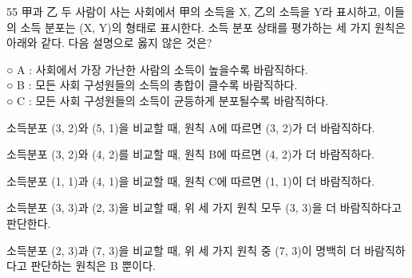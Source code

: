 \begin{question}{55}
甲과 乙 두 사람이 사는 사회에서 甲의 소득을 X, 乙의 소득을 Y라 표시하고, 이들의 소득 분포는 (X, Y)의 형태로 표시한다. 소득 분포 상태를 평가하는 세 가지 원칙은 아래와 같다. 다음 설명으로 옳지 않은 것은?
\begin{framedtext}
○ A : 사회에서 가장 가난한 사람의 소득이 높을수록 바람직하다.\\
○ B : 모든 사회 구성원들의 소득의 총합이 클수록 바람직하다.\\
○ C : 모든 사회 구성원들의 소득이 균등하게 분포될수록 바람직하다.
\end{framedtext}
\begin{choices}
  \item 소득분포 (3, 2)와 (5, 1)을 비교할 때, 원칙 A에 따르면 (3, 2)가 더 바람직하다.
  \item 소득분포 (3, 2)와 (4, 2)를 비교할 때, 원칙 B에 따르면 (4, 2)가 더 바람직하다.
  \item 소득분포 (1, 1)과 (4, 1)을 비교할 때, 원칙 C에 따르면 (1, 1)이 더 바람직하다.
  \item 소득분포 (3, 3)과 (2, 3)을 비교할 때, 위 세 가지 원칙 모두 (3, 3)을 더 바람직하다고 판단한다.
  \item 소득분포 (2, 3)과 (7, 3)을 비교할 때, 위 세 가지 원칙 중 (7, 3)이 명백히 더 바람직하다고 판단하는 원칙은 B 뿐이다.
\end{choices}
\end{question}
